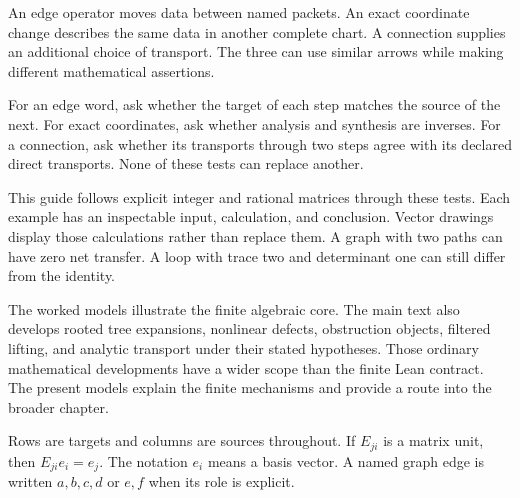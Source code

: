 An edge operator moves data between named packets. An exact coordinate change describes the same data in another complete chart. A connection supplies an additional choice of transport. The three can use similar arrows while making different mathematical assertions.


For an edge word, ask whether the target of each step matches the source of the next. For exact coordinates, ask whether analysis and synthesis are inverses. For a connection, ask whether its transports through two steps agree with its declared direct transports. None of these tests can replace another.

This guide follows explicit integer and rational matrices through these tests. Each example has an inspectable input, calculation, and conclusion. Vector drawings display those calculations rather than replace them. A graph with two paths can have zero net transfer. A loop with trace two and determinant one can still differ from the identity.

The worked models illustrate the finite algebraic core. The main text also develops rooted tree expansions, nonlinear defects, obstruction objects, filtered lifting, and analytic transport under their stated hypotheses. Those ordinary mathematical developments have a wider scope than the finite Lean contract. The present models explain the finite mechanisms and provide a route into the broader chapter.


Rows are targets and columns are sources throughout. If $E_{ji}$ is a matrix unit, then $E_{ji}e_i=e_j$. The notation $e_i$ means a basis vector. A named graph edge is written $a,b,c,d$ or $e,f$ when its role is explicit.

